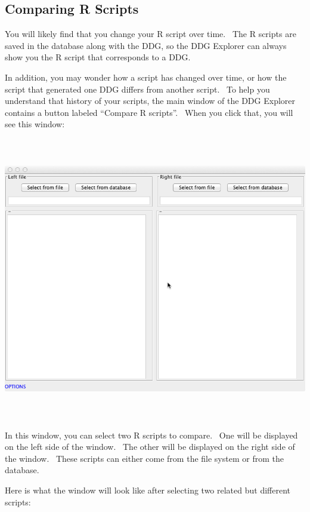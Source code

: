 \documentclass[letterpaper]{article}
\begin{document}
\subsection{Comparing R Scripts}
{\mdseries\upshape\color{black}
You will likely find that you change your R script over time. \ The R scripts are saved in the database along with the DDG, so the DDG Explorer can always show you the R script that corresponds to a DDG.}

{\mdseries\upshape\color{black}
In addition, you may wonder how a script has changed over time, or how the script that generated one DDG differs from another script. \ To help you understand that history of your scripts, the main window of the DDG Explorer contains a button labeled “Compare R scripts”. \ When you click that, you will see this window:}

 \includegraphics[width=6.5in,height=4.8752in]{UsingDDGExplorer-img/UsingDDGExplorer-img010.png} 

{\mdseries\upshape\color{black}
In this window, you can select two R scripts to compare. \ One will be displayed on the left side of the window. \ The other will be displayed on the right side of the window. \ These scripts can either come from the file system or from the database. \ }

{\mdseries\upshape\color{black}
Here is what the window will look like after selecting two related but different scripts:}
\end{document}
